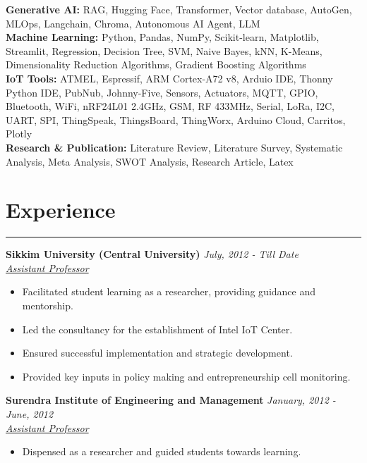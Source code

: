 \documentclass[10pt]{article}
\begin{document}
	

			\textbf{Generative AI:} RAG, Hugging Face, Transformer, Vector database, AutoGen, MLOps, Langchain, Chroma, Autonomous AI Agent, LLM
		\\ 
		\textbf{Machine Learning:} Python, Pandas, NumPy, Scikit-learn, Matplotlib, Streamlit, Regression, Decision Tree, SVM, Naive Bayes, kNN, K-Means, Dimensionality Reduction Algorithms, Gradient Boosting Algorithms 
			\\
		\textbf{IoT Tools:} ATMEL, Espressif, ARM Cortex-A72 v8, Arduio IDE, Thonny Python IDE,  PubNub, Johnny-Five, Sensors, Actuators, MQTT, GPIO, Bluetooth, WiFi, nRF24L01 2.4GHz, GSM, RF 433MHz, Serial, LoRa, I2C, UART, SPI, ThingSpeak, ThingsBoard, ThingWorx, Arduino Cloud, Carritos, Plotly
		\\
		\textbf{Research \& Publication:} Literature Review, Literature Survey, Systematic Analysis, Meta Analysis, SWOT Analysis, Research Article, Latex 

    
		\vspace*{-3mm}
		
	

\section*{Experience}
\vspace*{-2.5mm}
\hrule 
\vspace*{2mm}
  \noindent\textbf{Sikkim University (Central University)} \hfill \textit{July, 2012 - Till Date}\\
  \textit{\underline{Assistant Professor}} \\
  \vspace*{-4mm}
    \begin{itemize}[leftmargin=*]
	\item Facilitated student learning as a researcher, providing guidance and mentorship.
	    \vspace*{-2.5mm}
	\item Led the consultancy for the establishment of Intel IoT Center. 
	\vspace*{-2.5mm}
	\item Ensured successful implementation and strategic development.
	    \vspace*{-2.5mm}
	\item Provided key inputs in policy making and entrepreneurship cell monitoring.  
	\end{itemize}

  \noindent\textbf{Surendra Institute of Engineering and Management} \hfill \textit{January, 2012 - June, 2012}\\
  \textit{\underline{Assistant Professor}} \\
\vspace*{-4mm}
\begin{itemize}[leftmargin=*]
	\item Dispensed as a researcher and guided students towards learning.

\end{itemize}
\end{document}
